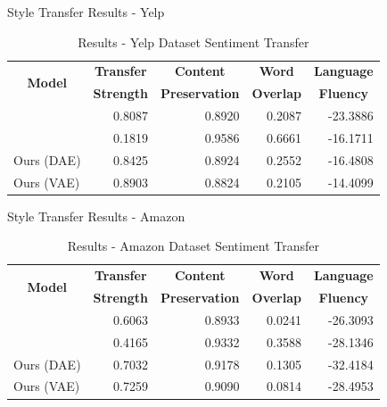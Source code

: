\documentclass[aspectratio=169]{beamer}
\newcommand{\tabh}[1]{\multicolumn{1}{c|}{\textbf{#1}}}
\newcommand{\tabc}[2]{\multicolumn{1}{|c||}{\multirow{#1}{*}{\textbf{#2}}}}
\begin{document}
\begin{frame}{Style Transfer Results - Yelp}
	\begin{table}[ht]
		\centering
		\begin{tabular}{| l || r | r | r | r |}
			\hline
			\tabc{2}{Model}       & \tabh{Transfer} & \tabh{Content}      & \tabh{Word}    & \tabh{Language} \\
			                      & \tabh{Strength} & \tabh{Preservation} & \tabh{Overlap} & \tabh{Fluency}  \\
			\hline
			\hline
			\citet{shen2017style} & 0.8087          & 0.8920              & 0.2087         & -23.3886        \\
			\hline
			\citet{fu2017style}   & 0.1819          & 0.9586              & 0.6661         & -16.1711        \\
			\hline
			Ours (DAE)            & 0.8425          & 0.8924              & 0.2552         & -16.4808        \\
			\hline
			Ours (VAE)            & 0.8903          & 0.8824              & 0.2105         & -14.4099        \\
			\hline
		\end{tabular}
		\caption{Results - Yelp Dataset Sentiment Transfer}
		\label{tab:comparison-previous}
	\end{table}
\end{frame}

\begin{frame}{Style Transfer Results - Amazon}
	\begin{table}[ht]
		\centering
		\begin{tabular}{| l || r | r | r | r |}
			\hline
			\tabc{2}{Model}       & \tabh{Transfer} & \tabh{Content}      & \tabh{Word}    & \tabh{Language} \\
			                      & \tabh{Strength} & \tabh{Preservation} & \tabh{Overlap} & \tabh{Fluency}  \\
			\hline
			\hline
			\citet{shen2017style} & 0.6063          & 0.8933              & 0.0241         & -26.3093        \\
			\hline
			\citet{fu2017style}   & 0.4165          & 0.9332              & 0.3588         & -28.1346        \\
			\hline
			Ours (DAE)            & 0.7032          & 0.9178              & 0.1305         & -32.4184        \\
			\hline
			Ours (VAE)            & 0.7259          & 0.9090              & 0.0814         & -28.4953        \\
			\hline
		\end{tabular}
		\caption{Results - Amazon Dataset Sentiment Transfer}
		\label{tab:comparison-previous-ama}
	\end{table}
\end{frame}
\end{document}
